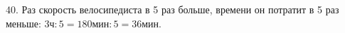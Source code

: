 40. Раз скорость велосипедиста в 5 раз больше, времени он потратит в 5 раз меньше: $3\text{ч}:5=180\text{мин}:5=36$мин.\\
